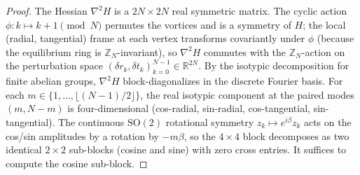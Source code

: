 %

\begin{proof}
The Hessian $\nabla^2 H$ is a $2N \times 2N$ real symmetric matrix.
The cyclic action $\phi : k \mapsto k + 1 \pmod N$ permutes the
vortices and is a symmetry of $H$; the local (radial, tangential)
frame at each vertex transforms covariantly under $\phi$ (because
the equilibrium ring is $\mathbb{Z}_N$-invariant), so $\nabla^2 H$
commutes with the $\mathbb{Z}_N$-action on the perturbation space
$(\delta r_k, \delta t_k)_{k=0}^{N-1} \in \mathbb{R}^{2N}$.
By the isotypic decomposition for finite abelian groups,
$\nabla^2 H$ block-diagonalizes in the discrete Fourier basis.
For each $m \in \{1, \ldots, \lfloor (N-1)/2 \rfloor\}$, the
real isotypic component at the paired modes $(m, N-m)$ is
four-dimensional (cos-radial, sin-radial, cos-tangential,
sin-tangential). The continuous $\mathrm{SO}(2)$ rotational symmetry
$z_k \mapsto e^{i\beta}z_k$ acts on the cos/sin amplitudes by a
rotation by $-m\beta$, so the $4 \times 4$ block decomposes as two
identical $2 \times 2$ sub-blocks (cosine and sine) with zero
cross entries. It suffices to compute the cosine sub-block.


\end{proof}

